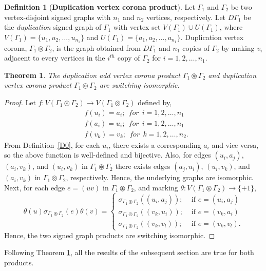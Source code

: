 \documentclass[12pt,a4paper]{article}
\newtheorem{theorem}{Theorem}[section]
\theoremstyle{definition}
\newtheorem{definition}{Definition}[section]
\theoremstyle{remark}
\begin{document}
    \begin{definition}[\textbf{Duplication vertex corona product}]
        Let $\Gamma_1$ and $\Gamma_2$ be two vertex-disjoint signed graphs with $n_1$ and $n_2$ vertices, respectively. Let $D\Gamma_1$ be the \textit{duplication} signed graph of $\Gamma_1$ with vertex set $V(\Gamma_1)\cup U(\Gamma_1)$, where $V(\Gamma_1)=\{u_1,u_2,\ldots,u_{n_1}\}$ and $U(\Gamma_1)=\{a_1,a_2,\ldots,a_{n_1}\}$. Duplication vertex corona, $\Gamma_1 \circledcirc \Gamma_2$, is the graph obtained from $D\Gamma_1$ and $n_1$ copies of $\Gamma_2$ by making $v_i$ adjacent to every vertices in the $i^{th}$ copy of $\Gamma_2$ for $i=1,2,\ldots,n_1.$
    \end{definition}

    \begin{theorem}\label{TH0}
        The duplication add vertex corona product $\Gamma_1 \circledast \Gamma_2$ and duplication vertex corona product $\Gamma_1 \circledcirc \Gamma_2$ are switching isomorphic.
    \end{theorem}
    \begin{proof}
        Let $f:V(\Gamma_1 \circledast \Gamma_2)\rightarrow V(\Gamma_1 \circledcirc \Gamma_2)$ defined by,
        \begin{equation*}
        \begin{split}
            &f(u_i)=a_i;~~for~~i=1,2,\ldots,n_1\\
            &f(a_i)=u_i;~~for~~i=1,2,\ldots,n_1\\
            &f(v_k)=v_k;~~for~~k=1,2,\ldots,n_2.
        \end{split}
        \end{equation*}
        From Definition~\ref{D0}, for each $u_i$, there exists a corresponding $a_i$ and vice versa, so the above function is well-defined and bijective. Also, for edges $(u_i,a_j)$, $(a_i,v_k)$, and $(u_i,v_k)$ in $\Gamma_1 \circledast \Gamma_2$ there exists edges $(a_j,u_i)$, $(u_i,v_k)$, and $(a_i,v_k)$ in $\Gamma_1 \circledcirc \Gamma_2$, respectively. Hence, the underlying graphs are isomorphic.\\
        Next, for each edge $e=(uv)$ in $\Gamma_1 \circledast \Gamma_2$, and marking $\theta:V(\Gamma_1 \circledast \Gamma_2)\rightarrow \{+1\}$,
        $$\theta(u)\sigma_{\Gamma_1 \circledast \Gamma_2}(e)\theta(v)=
        \begin{cases}
            \sigma_{\Gamma_1 \circledcirc \Gamma_2}((u_i,a_j));&\text{ if }e=(u_i,a_j)\\
            \sigma_{\Gamma_1 \circledcirc \Gamma_2}((v_k,u_i));&\text{ if }e=(v_k,a_i)\\
            \sigma_{\Gamma_1 \circledcirc \Gamma_2}((v_k,v_l));&\text{ if }e=(v_k,v_l).
        \end{cases}$$
        Hence, the two signed graph products are switching isomorphic.
    \end{proof}
    Following Theorem \ref{TH0}, all the results of the subsequent section are true for both products.
    
\end{document}
